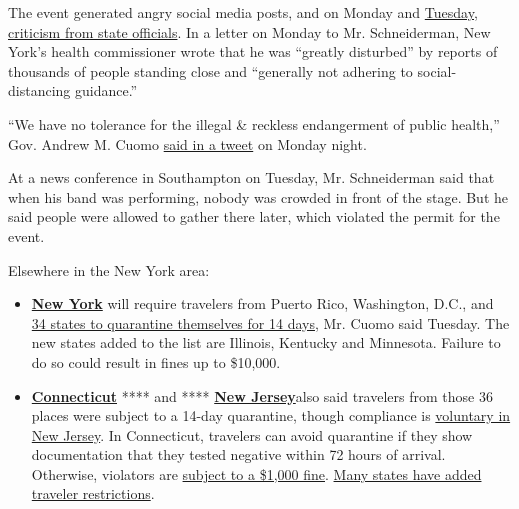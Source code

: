 The event generated angry social media posts, and on Monday and
\href{https://twitter.com/jessemckinley/status/1288137475513356288}{Tuesday,
criticism from state officials}. In a letter on Monday to Mr.
Schneiderman, New York's health commissioner wrote that he was ``greatly
disturbed'' by reports of thousands of people standing close and
``generally not adhering to social-distancing guidance.''

``We have no tolerance for the illegal \& reckless endangerment of
public health,'' Gov. Andrew M. Cuomo
\href{https://twitter.com/NYGovCuomo/status/1287901143172108289}{said in
a tweet} on Monday night.

At a news conference in Southampton on Tuesday, Mr. Schneiderman said
that when his band was performing, nobody was crowded in front of the
stage. But he said people were allowed to gather there later, which
violated the permit for the event.

Elsewhere in the New York area:

\begin{itemize}
\item
  \textbf{\href{https://twitter.com/NYGovCuomo/status/1288192727323234305}{New
  York}} will require travelers from Puerto Rico, Washington, D.C., and
  \href{https://coronavirus.health.ny.gov/covid-19-travel-advisory}{34
  states to quarantine themselves for 14 days}, Mr. Cuomo said Tuesday.
  The new states added to the list are Illinois, Kentucky and Minnesota.
  Failure to do so could result in fines up to \$10,000.
\item
  \textbf{\href{https://twitter.com/GovNedLamont/status/1288158459272351744}{Connecticut}}
  **** and ****
  \textbf{\href{https://twitter.com/GovMurphy/status/1288154313265750018}{New
  Jersey}}\href{https://twitter.com/GovMurphy/status/1288154313265750018}{}also
  said travelers from those 36 places were subject to a 14-day
  quarantine, though compliance is
  \href{https://covid19.nj.gov/faqs/nj-information/travel-information/which-states-are-on-the-travel-advisory-list-are-there-travel-restrictions-to-or-from-new-jersey}{voluntary
  in New Jersey}. In Connecticut, travelers can avoid quarantine if they
  show documentation that they tested negative within 72 hours of
  arrival. Otherwise, violators are
  \href{https://portal.ct.gov/-/media/Coronavirus/20200723-DPH-travel-advisory.pdf}{subject
  to a \$1,000 fine}.
  \href{https://www.nytimes3xbfgragh.onion/2020/07/10/travel/state-travel-restrictions.html}{Many
  states have added traveler restrictions}.
\end{itemize}

